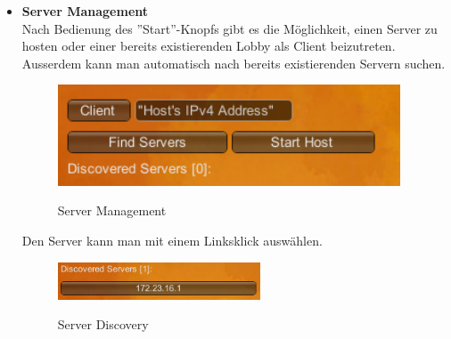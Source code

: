 \begin{itemize}
\begin {itemize}
        \item \textbf{Server Management}\\
            Nach Bedienung des ''Start''-Knopfs gibt es die Möglichkeit, einen Server zu hosten oder einer bereits existierenden Lobby als Client beizutreten. Ausserdem kann man
            automatisch nach bereits existierenden Servern suchen.
            \begin{figure}[H]
                \centering
                \includegraphics[height = 3cm]{resources/server.png}\\
                \caption{Server Management}
            \end{figure}
            Den Server kann man mit einem Linksklick auswählen.
            \begin{figure}[H]
                \centering
                \includegraphics[width=6cm]{resources/discovered.png}\\
                \caption{Server Discovery}
            \end{figure}
            

\end{itemize}
\end{itemize}
